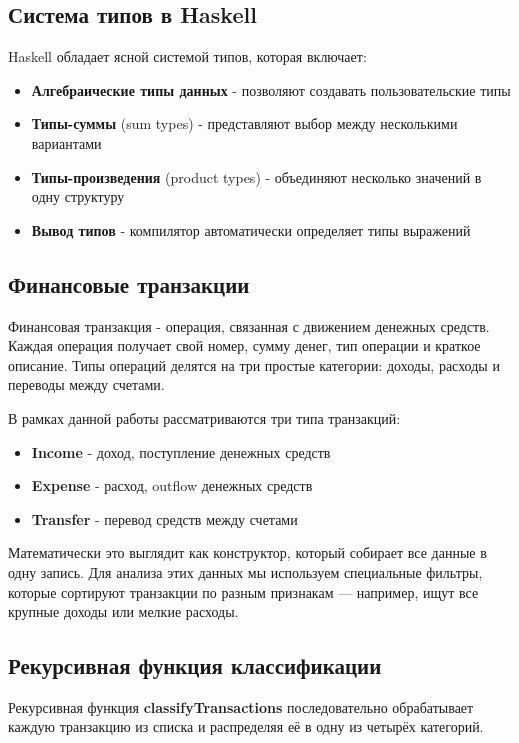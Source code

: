 \documentclass[a4paper, final]{article}
\begin{document}
	\subsection{Система типов в Haskell}
	
	Haskell обладает ясной системой типов, которая включает:
	
	\begin{itemize}
		\item \textbf{Алгебраические типы данных} - позволяют создавать пользовательские типы
		\item \textbf{Типы-суммы} (sum types) - представляют выбор между несколькими вариантами
		\item \textbf{Типы-произведения} (product types) - объединяют несколько значений в одну структуру
		\item \textbf{Вывод типов} - компилятор автоматически определяет типы выражений
	\end{itemize}
	
	\subsection{Финансовые транзакции}
	
	Финансовая транзакция - операция, связанная с движением денежных средств. Каждая операция получает свой номер, сумму денег, тип операции и краткое описание. Типы операций делятся на три простые категории: доходы, расходы и переводы между счетами. 
	
	В рамках данной работы рассматриваются три типа транзакций:
	
	\begin{itemize}
		\item \textbf{Income} - доход, поступление денежных средств
		\item \textbf{Expense} - расход, outflow денежных средств  
		\item \textbf{Transfer} - перевод средств между счетами
	\end{itemize}
	
	Математически это выглядит как конструктор, который собирает все данные в одну запись. Для анализа этих данных мы используем специальные фильтры, которые сортируют транзакции по разным признакам — например, ищут все крупные доходы или мелкие расходы. 
	
	\subsection{Рекурсивная функция классификации}
	\par Рекурсивная функция \textbf{classifyTransactions} последовательно обрабатывает каждую транзакцию из списка и распределяя её в одну из четырёх категорий.
	
\end{document}
